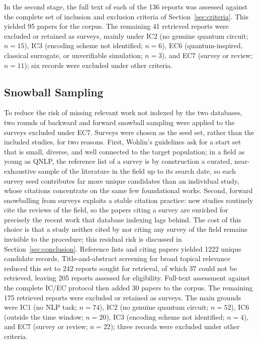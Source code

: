 \documentclass{ieeeaccess}
\begin{document}
In the second stage, the full text of each of the 136 reports was assessed against the complete set of inclusion and exclusion criteria of Section~\ref{sec:criteria}. This yielded 95 papers for the corpus. The remaining 41 retrieved reports were excluded or retained as surveys, mainly under IC2 (no genuine quantum circuit; $n = 15$), IC3 (encoding scheme not identified; $n = 6$), EC6 (quantum-inspired, classical surrogate, or unverifiable simulation; $n = 3$), and EC7 (survey or review; $n = 11$); six records were excluded under other criteria.

\subsection{Snowball Sampling}
\label{subsec:snowball}
To reduce the risk of missing relevant work not indexed by the two databases, two rounds of backward and forward snowball sampling \cite{wohlin2014guidelines} were applied to the surveys excluded under EC7. Surveys were chosen as the seed set, rather than the included studies, for two reasons. First, Wohlin's guidelines ask for a start set that is small, diverse, and well connected to the target population; in a field as young as QNLP, the reference list of a survey is by construction a curated, near-exhaustive sample of the literature in the field up to its search date, so each survey seed contributes far more unique candidates than an individual study, whose citations concentrate on the same few foundational works. Second, forward snowballing from surveys exploits a stable citation practice: new studies routinely cite the reviews of the field, so the papers citing a survey are enriched for precisely the recent work that database indexing lags behind. The cost of this choice is that a study neither cited by nor citing any survey of the field remains invisible to the procedure; this residual risk is discussed in Section~\ref{sec:conclusion}. Reference lists and citing papers yielded 1222 unique candidate records. Title-and-abstract screening for broad topical relevance reduced this set to 242 reports sought for retrieval, of which 37 could not be retrieved, leaving 205 reports assessed for eligibility. Full-text assessment against the complete IC/EC protocol then added 30 papers to the corpus. The remaining 175 retrieved reports were excluded or retained as surveys. The main grounds were IC1 (no NLP task; $n = 74$), IC2 (no genuine quantum circuit; $n = 52$), IC6 (outside the time window; $n = 20$), IC3 (encoding scheme not identified; $n = 4$), and EC7 (survey or review; $n = 22$); three records were excluded under other criteria.
\end{document}
